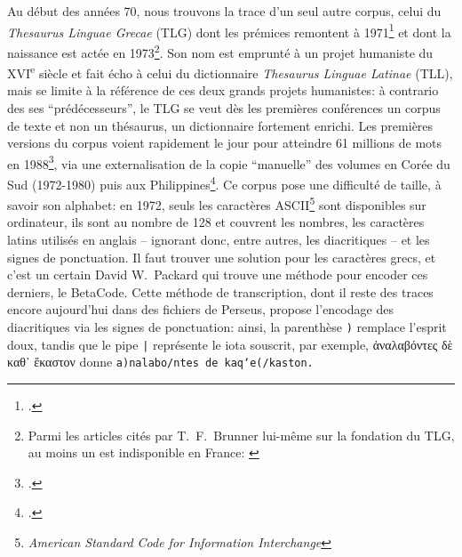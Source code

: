 Au début des années 70, nous trouvons la trace d'un seul autre corpus, celui du \textit{Thesaurus Linguae Grecae} (TLG) dont les prémices remontent à 1971\footcite{brunner_classics_1993} et dont la naissance est actée en 1973\footnote{Parmi les articles cités par T.~F.~Brunner lui-même sur la fondation du TLG, au moins un est indisponible en France: \cite{hugues_homer_1987}}. Son nom est emprunté à un projet humaniste du XVI\textsuperscript{e} siècle et fait écho à celui du dictionnaire \textit{Thesaurus Linguae Latinae} (TLL), mais se limite à la référence de ces deux grands projets humanistes: à contrario des ses \enquote{prédécesseurs}, le TLG se veut dès les premières conférences un corpus de texte et non un thésaurus, un dictionnaire fortement enrichi. Les premières versions du corpus voient rapidement le jour pour atteindre 61 millions de mots en 1988\footcite{brunner_overcoming_1988}, via une externalisation de la copie \enquote{manuelle} des volumes en Corée du Sud (1972-1980) puis aux Philippines\footcite[p. 111]{helgerson_cd-rom_1988}. Ce corpus pose une difficulté de taille, à savoir son alphabet: en 1972, seuls les caractères ASCII\footnote{\textit{American Standard Code for Information Interchange}} sont disponibles sur ordinateur, ils sont au nombre de 128 et couvrent les nombres, les caractères latins utilisés en anglais -- ignorant donc, entre autres, les diacritiques -- et les signes de ponctuation. Il faut trouver une solution pour les caractères grecs, et c'est un certain David W.~Packard qui trouve une méthode pour encoder ces derniers, le BetaCode. Cette méthode de transcription, dont il reste des traces encore aujourd'hui dans des fichiers de Perseus, propose l'encodage des diacritiques via les signes de ponctuation: ainsi, la parenthèse \texttt{)} remplace l'esprit doux, tandis que le pipe \texttt{|} représente le iota souscrit, par exemple, ἀναλαβόντες δὲ καθ᾽ ἕκαστον donne \texttt{a)nalabo/ntes de\ kaq`e(/kaston.}


